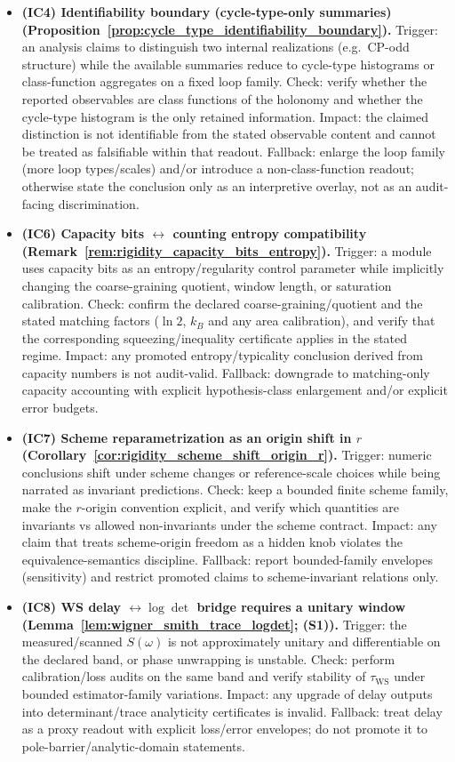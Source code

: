 \begin{itemize}
\item \textbf{(IC4) Identifiability boundary (cycle-type-only summaries) (Proposition~\ref{prop:cycle_type_identifiability_boundary}).}
  Trigger: an analysis claims to distinguish two internal realizations (e.g.\ CP-odd structure) while the available summaries reduce to cycle-type histograms or class-function aggregates on a fixed loop family.
  Check: verify whether the reported observables are class functions of the holonomy and whether the cycle-type histogram is the only retained information.
  Impact: the claimed distinction is not identifiable from the stated observable content and cannot be treated as falsifiable within that readout.
  Fallback: enlarge the loop family (more loop types/scales) and/or introduce a non-class-function readout; otherwise state the conclusion only as an interpretive overlay, not as an audit-facing discrimination.

\item \textbf{(IC6) Capacity bits $\leftrightarrow$ counting entropy compatibility (Remark~\ref{rem:rigidity_capacity_bits_entropy}).}
  Trigger: a module uses capacity bits as an entropy/regularity control parameter while implicitly changing the coarse-graining quotient, window length, or saturation calibration.
  Check: confirm the declared coarse-graining/quotient and the stated matching factors ($\ln 2$, $k_B$ and any area calibration), and verify that the corresponding squeezing/inequality certificate applies in the stated regime.
  Impact: any promoted entropy/typicality conclusion derived from capacity numbers is not audit-valid.
  Fallback: downgrade to matching-only capacity accounting with explicit hypothesis-class enlargement and/or explicit error budgets.

\item \textbf{(IC7) Scheme reparametrization as an origin shift in $r$ (Corollary~\ref{cor:rigidity_scheme_shift_origin_r}).}
  Trigger: numeric conclusions shift under scheme changes or reference-scale choices while being narrated as invariant predictions.
  Check: keep a bounded finite scheme family, make the $r$-origin convention explicit, and verify which quantities are invariants vs allowed non-invariants under the scheme contract.
  Impact: any claim that treats scheme-origin freedom as a hidden knob violates the equivalence-semantics discipline.
  Fallback: report bounded-family envelopes (sensitivity) and restrict promoted claims to scheme-invariant relations only.

\item \textbf{(IC8) WS delay $\leftrightarrow \log\det$ bridge requires a unitary window (Lemma~\ref{lem:wigner_smith_trace_logdet}; (S1)).}
  Trigger: the measured/scanned $S(\omega)$ is not approximately unitary and differentiable on the declared band, or phase unwrapping is unstable.
  Check: perform calibration/loss audits on the same band and verify stability of $\tau_{\mathrm{WS}}$ under bounded estimator-family variations.
  Impact: any upgrade of delay outputs into determinant/trace analyticity certificates is invalid.
  Fallback: treat delay as a proxy readout with explicit loss/error envelopes; do not promote it to pole-barrier/analytic-domain statements.


\end{itemize}
